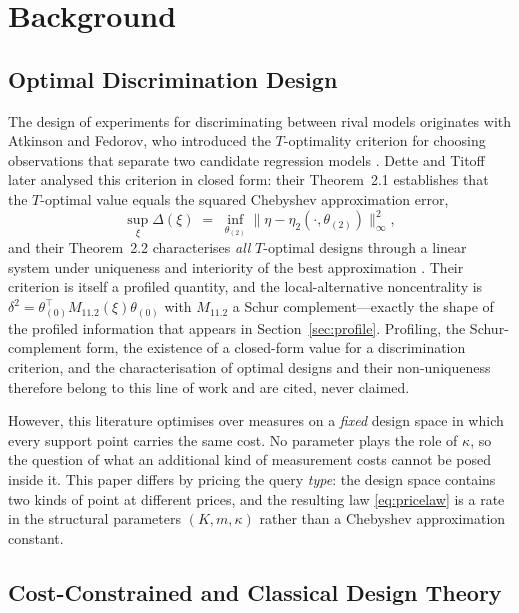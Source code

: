 \section{Background}

\subsection{Optimal Discrimination Design}

The design of experiments for discriminating between rival models originates with Atkinson
and Fedorov, who introduced the $T$-optimality criterion for choosing observations that
separate two candidate regression models \cite{atkinson1975}. Dette and Titoff later
analysed this criterion in closed form: their Theorem~2.1 establishes that the $T$-optimal
value equals the squared Chebyshev approximation error,
\begin{equation}
\sup_{\xi}\Delta(\xi)
  \;=\; \inf_{\theta_{(2)}}\bigl\lVert \eta-\eta_{2}(\cdot,\theta_{(2)})\bigr\rVert_{\infty}^{2},
\label{eq:chebyshev}
\end{equation}
and their Theorem~2.2 characterises \emph{all} $T$-optimal designs through a linear system
under uniqueness and interiority of the best approximation \cite{dette2009}. Their criterion
is itself a profiled quantity, and the local-alternative noncentrality is
$\delta^{2}=\theta_{(0)}^{\top}M_{11.2}(\xi)\theta_{(0)}$ with $M_{11.2}$ a Schur
complement---exactly the shape of the profiled information that appears in
Section~\ref{sec:profile}. Profiling, the Schur-complement form, the existence of a
closed-form value for a discrimination criterion, and the characterisation of optimal
designs and their non-uniqueness therefore belong to this line of work and are cited, never
claimed.

However, this literature optimises over measures on a \emph{fixed} design space in which
every support point carries the same cost. No parameter plays the role of $\kappa$, so the
question of what an additional kind of measurement costs cannot be posed inside it. This
paper differs by pricing the query \emph{type}: the design space contains two kinds of
point at different prices, and the resulting law \eqref{eq:pricelaw} is a rate in the
structural parameters $(K,m,\kappa)$ rather than a Chebyshev approximation constant.

\subsection{Cost-Constrained and Classical Design Theory}

